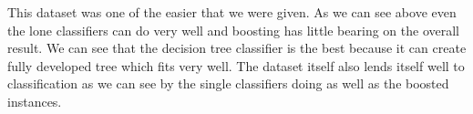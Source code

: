 This dataset was one of the easier that we were given. As we can see above even
the lone classifiers can do very well and boosting has little bearing on the
overall result. We can see that the decision tree classifier is the best because
it can create fully developed tree which fits very well. The dataset itself
also lends itself well to classification as we can see by the single
classifiers doing as well as the boosted instances.
